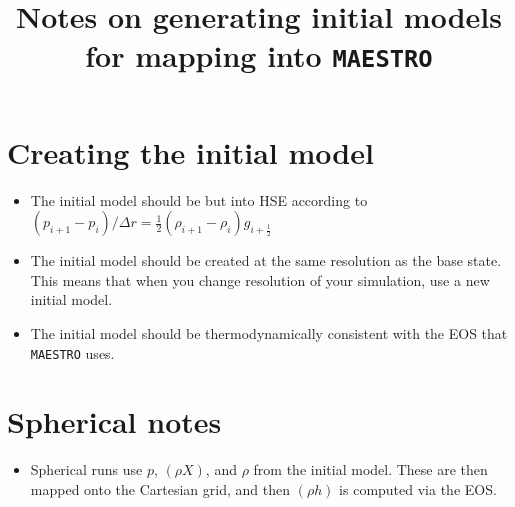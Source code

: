 \documentclass[11pt]{article}
\title{Notes on generating initial models for mapping into {\tt MAESTRO}}
\def\half  {\frac{1}{2}}
\begin{document}
\maketitle
\tableofcontents

\section{Creating the initial model}
\begin{itemize}
\item The initial model should be but into HSE according to $(p_{i+1} - p_i)/\Delta r = \half (\rho_{i+1} - \rho_i) g_{i+\half}$

\item The initial model should be created at the same resolution as the base state.  This means that
when you change resolution of your simulation, use a new initial model.

\item The initial model should be thermodynamically consistent with the EOS that {\tt MAESTRO}
uses.

\end{itemize}

\section{Spherical notes}
\begin{itemize}
\item Spherical runs use $p$, $(\rho X)$, and $\rho$ from the initial model.  These are then
mapped onto the Cartesian grid, and then $(\rho h)$ is computed via the EOS.
\end{itemize}
\end{document}
